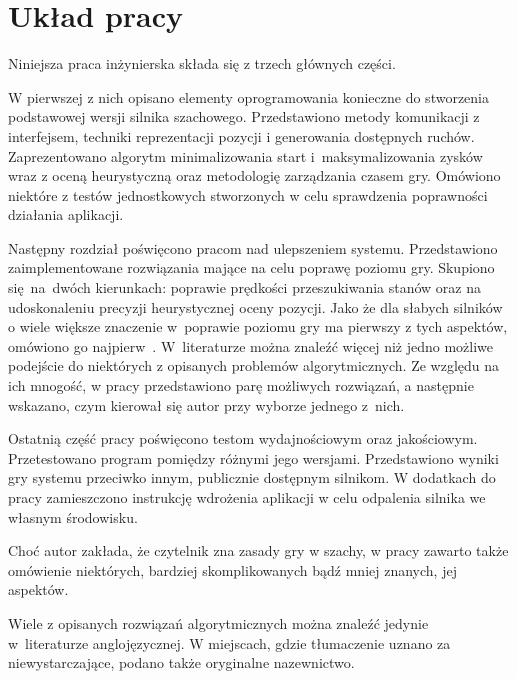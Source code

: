 \section{Układ pracy}
\label{sec:uklad-pracy}

Niniejsza praca inżynierska składa się z trzech głównych części.

W pierwszej z nich opisano elementy oprogramowania konieczne do stworzenia podstawowej wersji silnika szachowego.
Przedstawiono metody komunikacji z interfejsem, techniki reprezentacji pozycji i generowania dostępnych ruchów.
Zaprezentowano algorytm minimalizowania start i~maksymalizowania zysków wraz z oceną heurystyczną oraz metodologię zarządzania czasem gry.
Omówiono niektóre z testów jednostkowych stworzonych w celu sprawdzenia poprawności działania aplikacji.

Następny rozdział poświęcono pracom nad ulepszeniem systemu.
Przedstawiono zaimplementowane rozwiązania mające na celu poprawę poziomu gry.
Skupiono się~na~dwóch kierunkach: poprawie prędkości przeszukiwania stanów oraz na udoskonaleniu precyzji heurystycznej oceny pozycji.
Jako że dla słabych silników o wiele większe znaczenie w~poprawie poziomu gry ma pierwszy z tych aspektów, omówiono go najpierw~\cite*{Vrzina2023}.
W~literaturze można znaleźć więcej niż jedno możliwe podejście do niektórych z opisanych problemów algorytmicznych.
Ze względu na ich mnogość, w pracy przedstawiono parę możliwych rozwiązań, a następnie wskazano, czym kierował się autor przy wyborze jednego z~nich.

Ostatnią część pracy poświęcono testom wydajnościowym oraz jakościowym.
Przetestowano program pomiędzy różnymi jego wersjami.
Przedstawiono wyniki gry systemu przeciwko innym, publicznie dostępnym silnikom.
W dodatkach do pracy zamieszczono instrukcję wdrożenia aplikacji w celu odpalenia silnika we własnym środowisku.

Choć autor zakłada, że czytelnik zna zasady gry w szachy, w pracy zawarto także omówienie niektórych, bardziej skomplikowanych bądź mniej znanych, jej aspektów.

Wiele z opisanych rozwiązań algorytmicznych można znaleźć jedynie w~literaturze anglojęzycznej.
W miejscach, gdzie tłumaczenie uznano za niewystarczające, podano także oryginalne nazewnictwo.